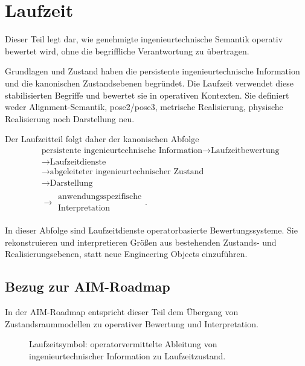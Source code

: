 
\chapter*{Laufzeit}
{}

Dieser Teil legt dar, wie genehmigte ingenieurtechnische Semantik operativ
bewertet wird, ohne die begriffliche Verantwortung zu übertragen.

Grundlagen und Zustand haben die persistente ingenieurtechnische Information
und die kanonischen Zustandsebenen begründet. Die Laufzeit verwendet diese
stabilisierten Begriffe und bewertet sie in operativen Kontexten. Sie
definiert weder Alignment-Semantik, pose2/pose3, metrische Realisierung,
physische Realisierung noch Darstellung neu.

Der Laufzeitteil folgt daher der kanonischen Abfolge
\[
\begin{aligned}
&\text{persistente ingenieurtechnische Information}
\rightarrow
\text{Laufzeitbewertung}
\\
&\rightarrow
\text{Laufzeitdienste}
\\
&\rightarrow
\text{abgeleiteter ingenieurtechnischer Zustand}
\\
&\rightarrow
\text{Darstellung}
\\
&\rightarrow
\substack{\text{anwendungsspezifische}\\\text{Interpretation}}.
\end{aligned}
\]

In dieser Abfolge sind Laufzeitdienste operatorbasierte Bewertungssysteme.
Sie rekonstruieren und interpretieren Größen aus bestehenden Zustands- und
Realisierungsebenen, statt neue Engineering Objects einzuführen.

\section*{Bezug zur AIM-Roadmap}

In der AIM-Roadmap entspricht dieser Teil dem Übergang von
Zustandsraummodellen zu operativer Bewertung und Interpretation.

\begin{figure}[ht]
\centering

\caption{Laufzeitsymbol: operatorvermittelte Ableitung von ingenieurtechnischer Information zu Laufzeitzustand.}
\label{fig:icon-runtime-operator-chain}
\end{figure}

